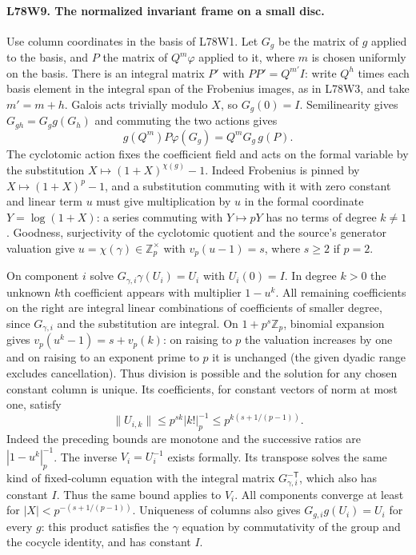 \paragraph{L78W9. The normalized invariant frame on a small disc.}
Use column coordinates in the basis of L78W1. Let $G_g$ be the
matrix of $g$ applied to the basis, and $P$ the matrix of
$Q^m\varphi$ applied to it, where $m$ is chosen uniformly on the
basis. There is an integral matrix $P'$ with $PP'=Q^{m'}I$:
write $Q^h$ times each basis element in the integral span of the
Frobenius images, as in L78W3, and take $m'=m+h$. Galois
acts trivially modulo $X$, so $G_g(0)=I$. Semilinearity gives
$G_{gh}=G_g g(G_h)$ and commuting the two actions gives
\[
           g(Q^m)P\varphi(G_g)=Q^m G_g\,g(P).
\]
The cyclotomic action fixes the coefficient field and acts
on the formal variable by the substitution
$X\mapsto(1+X)^{\chi(g)}-1$. Indeed Frobenius is pinned by
$X\mapsto(1+X)^p-1$, and a substitution commuting with it
with zero constant and linear term $u$ must give multiplication by
$u$ in the formal coordinate $Y=\log(1+X)$: a series commuting
with $Y\mapsto pY$ has no terms of degree $k\ne1$.
Goodness, surjectivity of the cyclotomic quotient and the source's
generator valuation give $u=\chi(\gamma)\in\mathbb Z_p^\times$
with $v_p(u-1)=s$, where $s\ge2$ if $p=2$.

On component $i$ solve $G_{\gamma,i}\gamma(U_i)=U_i$ with
$U_i(0)=I$. In degree $k>0$ the unknown $k$th coefficient
appears with multiplier $1-u^k$. All remaining coefficients on
the right are integral linear combinations of coefficients of
smaller degree, since $G_{\gamma,i}$ and the substitution are
integral. On $1+p^s\mathbb Z_p$, binomial expansion gives
$v_p(u^k-1)=s+v_p(k)$: on raising to $p$ the valuation increases
by one and on raising to an exponent prime to $p$ it is unchanged
(the given dyadic range excludes cancellation). Thus division is
possible and the solution for any chosen constant column is unique.
Its coefficients, for constant vectors of norm at most one, satisfy
\[
       \|U_{i,k}\|\le p^{sk}|k!|_p^{-1}
                \le p^{k(s+1/(p-1))}.
\]
Indeed the preceding bounds are monotone and the successive ratios
are $|1-u^k|_p^{-1}$. The inverse $V_i=U_i^{-1}$ exists formally.
Its transpose solves the same kind of fixed-column equation with
the integral matrix $G_{\gamma,i}^{-\mathsf T}$, which also has
constant $I$. Thus the same bound applies to $V_i$. All components
converge at least for $|X|<p^{-(s+1/(p-1))}$. Uniqueness of columns
also gives $G_{g,i}g(U_i)=U_i$ for every $g$: this product satisfies
the $\gamma$ equation by commutativity of the group and the cocycle
identity, and has constant $I$.

